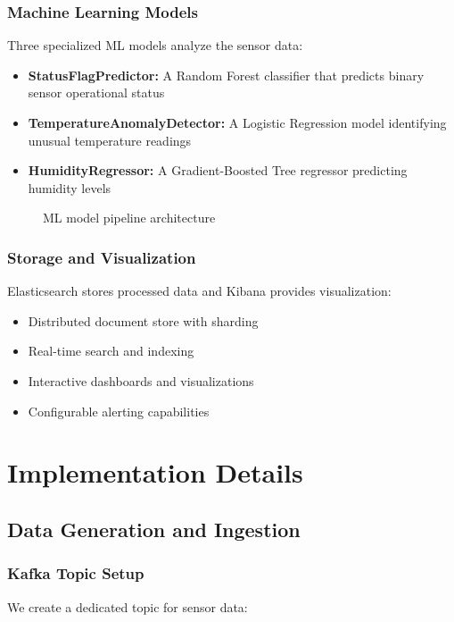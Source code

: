 \documentclass[11pt, a4paper]{article}
\begin{document}
\subsubsection{Machine Learning Models}
Three specialized ML models analyze the sensor data:
\begin{itemize}[leftmargin=*]
  \item \textbf{StatusFlagPredictor:} A Random Forest classifier that predicts binary sensor operational status
  \item \textbf{TemperatureAnomalyDetector:} A Logistic Regression model identifying unusual temperature readings
  \item \textbf{HumidityRegressor:} A Gradient-Boosted Tree regressor predicting humidity levels
\end{itemize}

\begin{figure}[h]
  \centering
  \caption{ML model pipeline architecture}
  \label{fig:ml_pipeline}
\end{figure}

\subsubsection{Storage and Visualization}
Elasticsearch stores processed data and Kibana provides visualization:
\begin{itemize}[leftmargin=*]
  \item Distributed document store with sharding
  \item Real-time search and indexing
  \item Interactive dashboards and visualizations
  \item Configurable alerting capabilities
\end{itemize}

\clearpage
\section{Implementation Details}
\subsection{Data Generation and Ingestion}
\subsubsection{Kafka Topic Setup}

We create a dedicated topic for sensor data:
\end{document}
